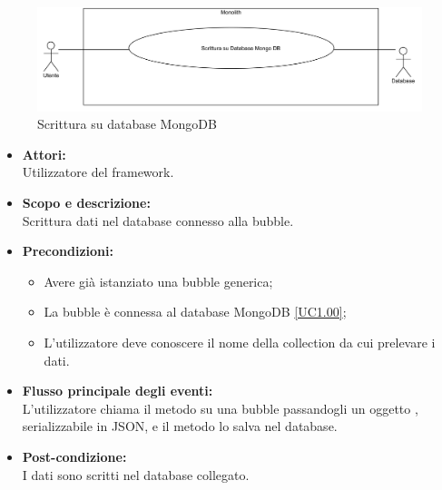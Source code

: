 \begin{samepage}
\nopagebreak
\begin{figure}[H]
	\centering
	\includegraphics[width=15cm]{../../documenti/AnalisiDeiRequisiti/Diagrammi_img/uc1_02.png}
	\caption{\UCFCaption{} Scrittura su database MongoDB}
\end{figure}

\end{samepage}
\begin{itemize}
\item \textbf{Attori:}
\\Utilizzatore del framework.
\item \textbf{Scopo e descrizione:} 
\\Scrittura dati nel database connesso alla bubble.
\item \textbf{Precondizioni:}
\begin{itemize}
	\item Avere già istanziato una bubble generica;
	\item La bubble è connessa al database MongoDB \ref{UC1.00};
	\item L'utilizzatore deve conoscere il nome della collection da cui prelevare i dati.
\end{itemize}
\item \textbf{Flusso principale degli eventi:}
\\L'utilizzatore chiama il metodo su una bubble passandogli un oggetto , serializzabile in JSON, e il metodo lo salva nel database.
\item \textbf{Post-condizione:}
\\I dati sono scritti nel database collegato.
\end{itemize}


